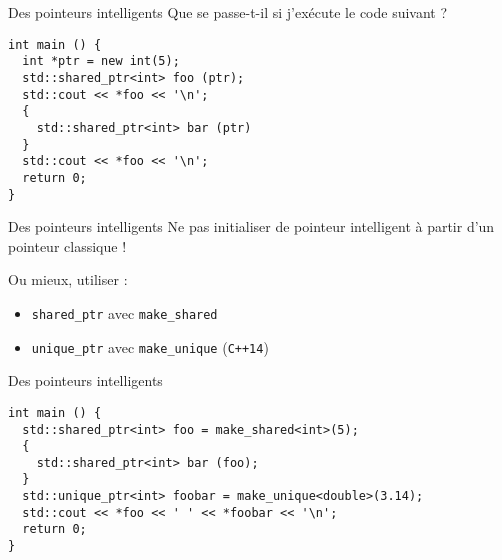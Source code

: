 \begin{frame}[fragile]{Des pointeurs intelligents}
  Que se passe-t-il si j'exécute le code suivant ?
  \begin{lstlisting}
int main () {
  int *ptr = new int(5);
  std::shared_ptr<int> foo (ptr);
  std::cout << *foo << '\n';
  {
    std::shared_ptr<int> bar (ptr)
  }
  std::cout << *foo << '\n';
  return 0;
}
  \end{lstlisting}
\end{frame}

\begin{frame}{Des pointeurs intelligents}
  Ne pas initialiser de pointeur intelligent à partir d'un pointeur classique !
  
  Ou mieux, utiliser :
  \begin{itemize}
  \item \texttt{shared\_ptr} avec \texttt{make\_shared}
  \item \texttt{unique\_ptr} avec \texttt{make\_unique} (\texttt{C++14})
  \end{itemize}
\end{frame}

\begin{frame}[fragile]{Des pointeurs intelligents}
  \begin{lstlisting}
int main () {
  std::shared_ptr<int> foo = make_shared<int>(5);
  {
    std::shared_ptr<int> bar (foo);
  }
  std::unique_ptr<int> foobar = make_unique<double>(3.14);
  std::cout << *foo << ' ' << *foobar << '\n';
  return 0;
}
  \end{lstlisting}
\end{frame}
